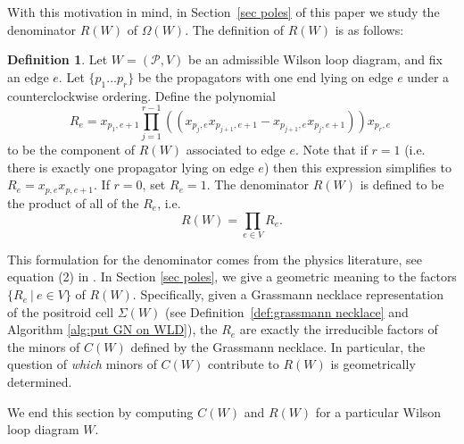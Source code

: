 \documentclass[11pt]{article}
\newcommand{\cP}{\mathcal{P}}
\theoremstyle{remark}
\theoremstyle{definition}
\newtheorem{dfn}[thm]{Definition}
\begin{document}
With this motivation in mind, in Section~\ref{sec poles} of this paper we study the denominator $R(W)$ of $\Omega(W)$. The definition of $R(W)$ is as follows:

\begin{dfn}\label{def R(W)}
Let $W = (\cP,V)$ be an admissible Wilson loop diagram, and fix an edge $e$. Let $\{p_1 \ldots p_r\}$ be the propagators with one end lying on edge $e$ under a counterclockwise ordering. Define the polynomial
\[ R_e =  x_{p_1,e+1} \prod_{j= 1}^{r-1} \left((x_{p_j,e} x_{p_{j+1},e+1} - x_{p_{j+1},e} x_{p_{j},e+1} ) \right) x_{p_r,e}\;\]
to be the component of $R(W)$ associated to edge $e$. Note that if $r = 1$ (i.e. there is exactly one propagator lying on edge $e$) then this expression simplifies to $R_e = x_{p,e} x_{p,e+1}$. If $r=0$, set $R_e = 1$. The denominator $R(W)$ is defined to be the product of all of the $R_e$, i.e. 
\[R(W) = \prod_{e \in V} R_e.\]
\end{dfn}

This formulation for the denominator comes from the physics literature, see equation (2) in \cite{HeslopStewart}. In Section \ref{sec poles}, we give a geometric meaning to the factors $\{R_e\ |\ e \in V\}$ of $R(W)$.  Specifically, given a Grassmann necklace representation of the positroid cell $\Sigma(W)$ (see Definition~\ref{def:grassmann necklace} and Algorithm \ref{alg:put GN on WLD}), the $R_e$ are exactly the irreducible factors of the minors of $C(W)$ defined by the Grassmann necklace. In particular, the question of \emph{which} minors of $C(W)$ contribute to $R(W)$ is geometrically determined. 
 
We end this section by computing $C(W)$ and $R(W)$ for a particular Wilson loop diagram $W$.
\end{document}
